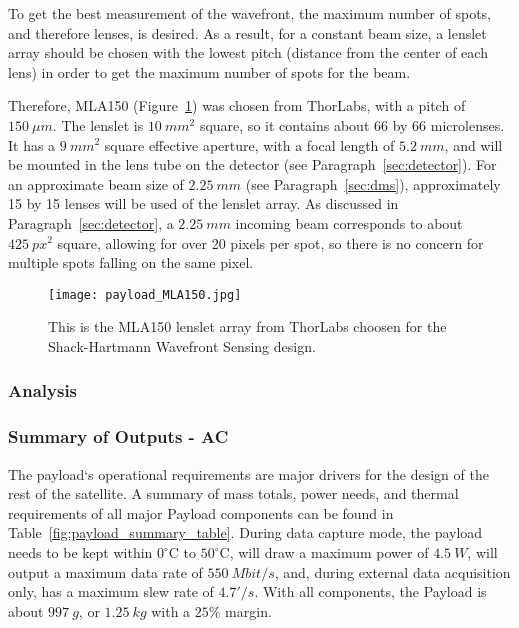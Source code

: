 \documentclass[12pt]{article}
\begin{document}
To get the best measurement of the wavefront, the maximum number of spots, and therefore lenses, is desired. As a result, for a constant beam size, a lenslet array should be chosen with the lowest pitch (distance from the center of each lens) in order to get the maximum number of spots for the beam.


Therefore, MLA150 (Figure~\ref{fig:MLA150}) was chosen from ThorLabs, with a pitch of $150\ \mu m$.
The lenslet is $10\ mm^2$ square, so it contains about 66 by 66 microlenses. It has a $9\ mm^2$ square effective aperture, with a focal length of $5.2\ mm$, and will be mounted in the lens tube on the detector (see Paragraph~\ref{sec:detector}). For an approximate beam size of $2.25\ mm$ (see Paragraph~\ref{sec:dms}), approximately 15 by 15 lenses will be used of the lenslet array. As discussed in Paragraph~\ref{sec:detector}, a $2.25\ mm$ incoming beam corresponds to about $425\ px^2$ square, allowing for over 20 pixels per spot, so there is no concern for multiple spots falling on the same pixel. 

\begin{figure}[ht]
\centering
  \texttt{[image: payload\_MLA150.jpg]}
\caption{This is the MLA150 lenslet array from ThorLabs choosen for the Shack-Hartmann Wavefront Sensing design.}
\label{fig:MLA150}
\end{figure}


			\subsubsection{Analysis}

			\subsubsection{Summary of Outputs - AC}

The payload`s operational requirements are major drivers for the design of the rest of the satellite. A summary of mass totals, power needs, and thermal requirements of all major Payload components can be found in Table~\ref{fig:payload_summary_table}.  
During data capture mode, the payload needs to be kept within $0^\circ$C to $50^\circ$C, will draw a maximum power of $4.5\ W$, will output a maximum data rate of $550\ Mbit/s$, and, during external data acquisition only, has a maximum slew rate of $4.7'/s$. 
With all components, the Payload is about $997\ g$, or $1.25\ kg$ with a $25\%$ margin.  
\end{document}
